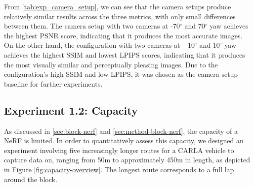 From \autoref{tab:exp_camera_setup}, we can see that the camera setups produce relatively similar results across the three metrics, with only small differences between them. The camera setup with two cameras at -70$^{\circ}$ and 70$^{\circ}$ yaw achieves the highest PSNR score, indicating that it produces the most accurate images. On the other hand, the configuration with two cameras at $-10^{\circ}$ and $10^{\circ}$ yaw achieves the highest SSIM and lowest LPIPS scores, indicating that it produces the most visually similar and perceptually pleasing images. Due to the configuration's high SSIM and low LPIPS, it was chosen as the camera setup baseline for further experiments.












\subsection{Experiment 1.2: Capacity} \label{sec:exp-capacity}
As discussed in \autoref{sec:block-nerf} and \autoref{sec:method-block-nerf}, the capacity of a NeRF is limited. In order to quantitatively assess this capacity, we designed an experiment involving five increasingly longer routes for a CARLA vehicle to capture data on, ranging from 50m to approximately 450m in length, as depicted in Figure \ref{fig:capacity-overview}. The longest route corresponds to a full lap around the block.


